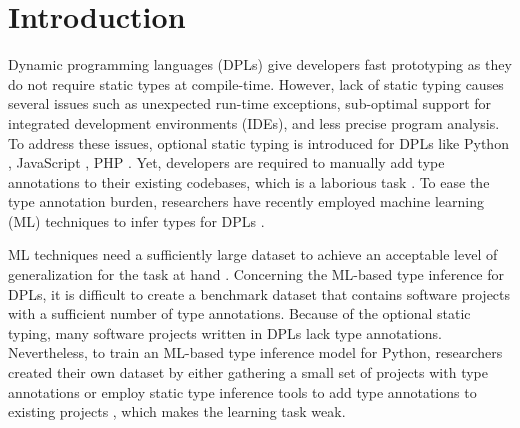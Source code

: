 \documentclass[10pt, conference]{IEEEtran}
\begin{document}
\section{Introduction}
Dynamic programming languages (DPLs) give developers fast prototyping as they do not require static types at compile-time. However, lack of static typing causes several issues such as unexpected run-time exceptions, sub-optimal support for integrated development environments (IDEs), and less precise program analysis. To address these issues, optional static typing is introduced for DPLs like Python \cite{van2014pep}, JavaScript \cite{bierman2014understanding}, PHP \cite{klingstrom2020type}. Yet, developers are required to manually add type annotations to their existing codebases, which is a laborious task \cite{ore2018assessing}. To ease the type annotation burden, researchers have recently employed machine learning (ML) techniques to infer types for DPLs \cite{malik2019nl2type, pradel2019typewriter, allamanis2020typilus}.

%

ML techniques need a sufficiently large dataset to achieve an acceptable level of generalization for the task at hand \cite{sun2017revisiting}. Concerning the ML-based type inference for DPLs, it is difficult to create a benchmark dataset that contains software projects with a sufficient number of type annotations. Because of the optional static typing, many software projects written in DPLs lack type annotations. Nevertheless, to train an ML-based type inference model for Python, researchers created their own dataset by either gathering a small set of projects with type annotations \cite{pradel2019typewriter} or employ static type inference tools to add type annotations to existing projects \cite{allamanis2020typilus}, which makes the learning task weak.
\end{document}
